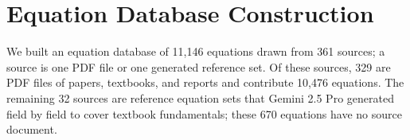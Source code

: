 \section{Equation Database Construction}
\label{sec:db}

We built an equation database of 11,146 equations drawn from 361 sources; a source is one PDF file
or one generated reference set. Of these sources, 329 are PDF files of papers, textbooks, and
reports and contribute 10,476 equations. The remaining 32 sources are reference equation
sets that Gemini 2.5 Pro\cite{Gemini25} generated field by field to cover textbook fundamentals;
these 670 equations have no source document.

